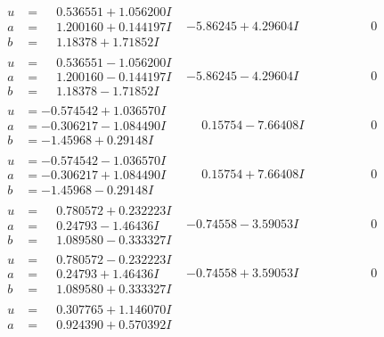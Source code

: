 \documentclass[1p]{elsarticle_modified}
\theoremstyle{definition}
\begin{document}
$$\begin{array}{c|c|c}
 \hline 
\begin{aligned}
u &= \phantom{-}0.536551 + 1.056200 I \\
a &= \phantom{-}1.200160 + 0.144197 I \\
b &= \phantom{-}1.18378 + 1.71852 I\end{aligned}
 & -5.86245 + 4.29604 I & \phantom{-0.000000 } 0 \\ \hline\begin{aligned}
u &= \phantom{-}0.536551 - 1.056200 I \\
a &= \phantom{-}1.200160 - 0.144197 I \\
b &= \phantom{-}1.18378 - 1.71852 I\end{aligned}
 & -5.86245 - 4.29604 I & \phantom{-0.000000 } 0 \\ \hline\begin{aligned}
u &= -0.574542 + 1.036570 I \\
a &= -0.306217 - 1.084490 I \\
b &= -1.45968 + 0.29148 I\end{aligned}
 & \phantom{-}0.15754 - 7.66408 I & \phantom{-0.000000 } 0 \\ \hline\begin{aligned}
u &= -0.574542 - 1.036570 I \\
a &= -0.306217 + 1.084490 I \\
b &= -1.45968 - 0.29148 I\end{aligned}
 & \phantom{-}0.15754 + 7.66408 I & \phantom{-0.000000 } 0 \\ \hline\begin{aligned}
u &= \phantom{-}0.780572 + 0.232223 I \\
a &= \phantom{-}0.24793 - 1.46436 I \\
b &= \phantom{-}1.089580 - 0.333327 I\end{aligned}
 & -0.74558 - 3.59053 I & \phantom{-0.000000 } 0 \\ \hline\begin{aligned}
u &= \phantom{-}0.780572 - 0.232223 I \\
a &= \phantom{-}0.24793 + 1.46436 I \\
b &= \phantom{-}1.089580 + 0.333327 I\end{aligned}
 & -0.74558 + 3.59053 I & \phantom{-0.000000 } 0 \\ \hline\begin{aligned}
u &= \phantom{-}0.307765 + 1.146070 I \\
a &= \phantom{-}0.924390 + 0.570392 I \\

\end{aligned}
\end{array}$$
\end{document}
